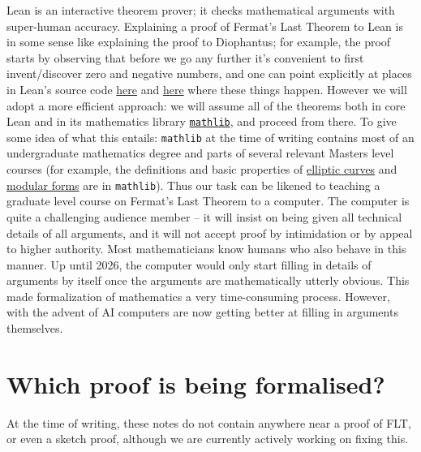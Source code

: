 Lean is an interactive theorem prover; it checks mathematical arguments with super-human accuracy.
Explaining a proof of Fermat's Last Theorem to Lean is in some sense like explaining the proof to
Diophantus; for example, the proof starts by observing that before we go any further it's convenient
to first invent/discover zero and negative numbers, and one can point explicitly at places in Lean's
source code \href{https://github.com/leanprover/lean4/blob/260eaebf4e804c9ac1319532970544a4e157c336/src/Init/Prelude.lean#L1049}{here}
and \href{https://github.com/leanprover/lean4/blob/260eaebf4e804c9ac1319532970544a4e157c336/src/Init/Data/Int/Basic.lean#L45}{here}
where these things happen. However we will adopt a more efficient approach: we will assume all of
the theorems both in core Lean and in its mathematics library
\href{https://github.com/leanprover-community/mathlib4}{\tt mathlib}, and proceed from there.
To give some idea of what this entails: {\tt mathlib} at the time of writing contains most of an
undergraduate mathematics degree and parts of several relevant Masters level courses (for example,
the definitions and basic properties of
\href{https://leanprover-community.github.io/mathlib4_docs/Mathlib/AlgebraicGeometry/EllipticCurve/Weierstrass.html}{elliptic curves}
and \href{https://leanprover-community.github.io/mathlib4_docs/Mathlib/NumberTheory/ModularForms/Basic.html}{modular forms}
are in {\tt mathlib}). Thus our task can be likened to teaching a graduate level course on
Fermat's Last Theorem to a computer. The computer is quite a challenging audience member -- it
will insist on being given all technical details of all arguments, and it will not accept proof by
intimidation or by appeal to higher authority. Most mathematicians know humans who also behave
in this manner. Up until 2026, the computer would only start filling
in details of arguments by itself once the arguments are mathematically utterly obvious.
This made formalization of mathematics a very time-consuming process. However, with the
advent of AI computers are now getting better at filling in arguments themselves.

\section{Which proof is being formalised?}

At the time of writing, these notes do not contain anywhere near a proof of FLT, or even a sketch proof,
although we are currently actively working on fixing this.

